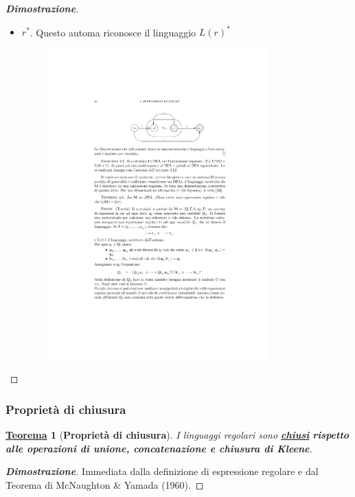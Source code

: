 \documentclass[a4paper]{article}
\newtheorem{theorem}{\textcolor{Red3}{\underline{Teorema}}}
\begin{document}
\begin{proof}[\textbf{Dimostrazione}]
\begin{itemize}
			\item $r^{*}$. Questo automa riconosce il linguaggio $L\left(r\right)^{*}$
				\begin{figure}[!htp]
					\centering
					\includegraphics[width=0.8\textwidth]{img/teorema_McN-Yamada6.pdf}
				\end{figure}
		\end{itemize}
	\end{proof}

	\newpage

	\subsubsection{Proprietà di chiusura}
	
	\begin{theorem}[\textcolor{Red3}{\textbf{Proprietà di chiusura}}]
		I linguaggi regolari sono \textbf{\underline{chiusi}} \textbf{rispetto alle operazioni di unione, concatenazione e chiusura di Kleene}.
	\end{theorem}
	\begin{proof}[\textcolor{Green4}{\textbf{Dimostrazione}}]
		Immediata dalla definizione di espressione regolare e dal Teorema di McNaughton \& Yamada (1960).
	\end{proof}
\end{document}
